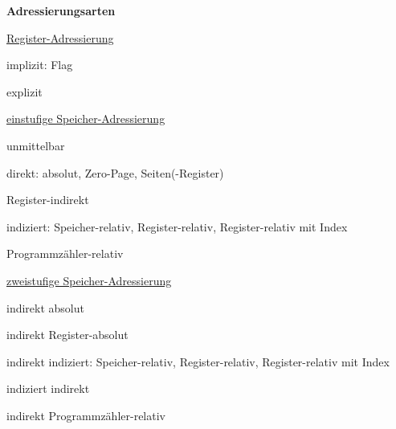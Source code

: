 \textbf{Adressierungsarten}
\begin{enumeration}
	\item \underline{Register-Adressierung}
	\begin{enumeration}
		\item implizit: Flag
		\item explizit
	\end{enumeration}
	\item \underline{einstufige Speicher-Adressierung}
	\begin{enumeration}
		\item unmittelbar
		\item direkt: absolut, Zero-Page, Seiten(-Register)
		\item Register-indirekt
		\item indiziert: Speicher-relativ, Register-relativ, Register-relativ mit Index
		\item Programmzähler-relativ
	\end{enumeration}
	\item \underline{zweistufige Speicher-Adressierung}
	\begin{enumeration}
		\item indirekt absolut
		\item indirekt Register-absolut
		\item indirekt indiziert: Speicher-relativ, Register-relativ, Register-relativ mit Index
		\item indiziert indirekt
		\item indirekt Programmzähler-relativ
	\end{enumeration}
\end{enumeration}

\newpage


